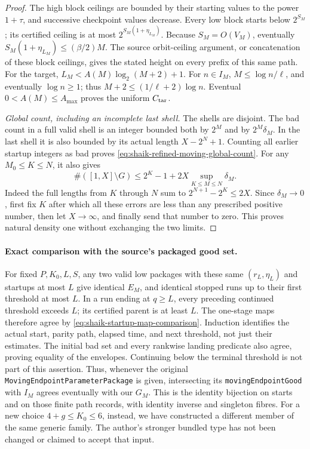 \documentclass[11pt]{article}
\theoremstyle{remark}\newtheorem{remark}[proposition]{Remark}
\begin{document}
\begin{proof}
The high block ceilings are bounded by their starting values to the
power \(1+\tau\), and successive checkpoint values decrease.
Every low block starts below \(2^{S_M}\); its certified ceiling is
at most \(2^{S_M(1+\eta_{L_M})}\). Because
\(S_M=O(V_M)\), eventually
\(S_M(1+\eta_{L_M})\le(\beta/2)M\).
The source orbit-ceiling argument, or concatenation of these block
ceilings, gives the stated height on every prefix of this same path.
For the target, \(L_M<A(M)\log_2(M+2)+1\).
For \(n\in I_M\), \(M\le\log n/\ell\), and eventually \(\log n\ge1\);
thus \(M+2\le(1/\ell+2)\log n\).
Eventual \(0<A(M)\le A_{\max}\) proves the uniform \(C_{\rm tar}\).

\emph{Global count, including an incomplete last shell.}
The shells are disjoint. The bad count in a full valid shell is an
integer bounded both by \(2^M\) and by \(2^M\delta_M\). In the last
shell it is also bounded by its actual length \(X-2^N+1\).
Counting all earlier startup integers as bad proves
\eqref{eq:shaik-refined-moving-global-count}.
For any \(M_0\le K\le N\), it also gives
\begin{equation}\label{eq:shaik-moving-tail-sup}
 \#([1,X]\setminus G)
 \le 2^K-1+2X\sup_{K\le M\le N}\delta_M.
\end{equation}
Indeed the full lengths from \(K\) through \(N\) sum to
\(2^{N+1}-2^K\le2X\). Since \(\delta_M\to0\), first fix \(K\) after
which all these errors are less than any prescribed positive number,
then let \(X\to\infty\), and finally send that number to zero.
This proves natural density one without exchanging the two limits.
\end{proof}

\paragraph{Exact comparison with the source's packaged good set.}
For fixed \(P,K_0,L,S\), any two valid low packages with these same
\((r_L,\eta_L)\) and startups at most \(L\) give identical
\(E_M\), and identical stopped runs up to their first threshold at
most \(L\). In a run ending at \(q\ge L\), every preceding continued
threshold exceeds \(L\); its certified parent is at least \(L\).
The one-stage maps therefore agree by
\eqref{eq:shaik-startup-map-comparison}. Induction identifies the
actual start, parity path, elapsed time, and next threshold, not just
their estimates. The initial bad set and every rankwise landing
predicate also agree, proving equality of the envelopes. Continuing
below the terminal threshold is not part of this assertion.
Thus, whenever the original
\texttt{MovingEndpointParameterPackage} is given, intersecting its
\texttt{movingEndpointGood} with \(I_M\) agrees eventually with our
\(G_M\). This is the identity bijection on starts and on those finite
path records, with identity inverse and singleton fibres.
For a new choice \(4+g\le K_0\le6\), instead, we have constructed a
different member of the same generic family. The author's stronger
bundled type has not been changed or claimed to accept that input.
\end{document}
